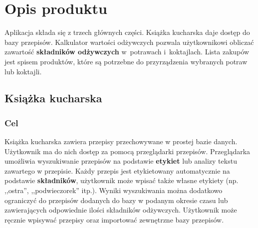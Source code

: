 \documentclass[12pt,leqno, twoside]{mwart}
\begin{document}
\section{Opis produktu}
Aplikacja składa się z trzech głównych części. Książka kucharska daje dostęp do bazy przepisów. Kalkulator wartości odżywczych pozwala użytkownikowi obliczać zawartość \textbf{składników odżywczych} w~potrawach i~koktajlach. Lista zakupów jest spisem produktów, które są potrzebne do przyrządzenia wybranych potraw lub koktajli. 

\subsection{Książka kucharska}
\subsubsection{Cel}
Książka kucharska zawiera przepisy przechowywane w prostej bazie danych. Użytkownik ma do nich dostęp za pomocą przeglądarki przepisów. Przeglądarka umożliwia wyszukiwanie przepisów na podstawie \textbf{etykiet} lub analizy tekstu zawartego w przepisie. Każdy przepis jest etykietowany automatycznie na podstawie \textbf{składników}, użytkownik może wpisać także własne etykiety (np. ,,ostra'', ,,podwieczorek'' itp.). Wyniki wyszukiwania można dodatkowo ograniczyć do przepisów dodanych do bazy w podanym okresie czasu lub zawierających odpowiednie ilości składników odżywczych. Użytkownik może ręcznie wpisywać przepisy oraz importować zewnętrzne bazy przepisów.
\end{document}
